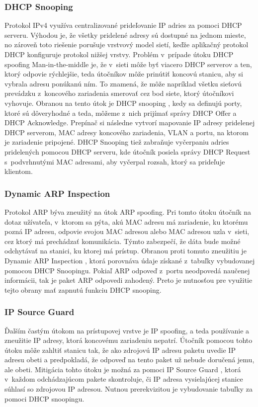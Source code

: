 \subsubsection{DHCP Snooping}
Protokol IPv4 využíva centralizované prideľovanie IP adries za pomoci DHCP serveru. Výhodou je, že všetky pridelené adresy sú dostupné na jednom mieste, no zároveň toto riešenie porušuje vrstvový model sietí, keďže aplikačný protokol DHCP konfiguruje protokol nižšej vrstvy. Problém v~prípade útoku DHCP spoofing Man-in-the-middle je, že v~sieti môže byť viacero DHCP serverov a ten, ktorý odpovie rýchlejšie, teda útočníkov môže prinútiť koncovú stanicu, aby si vybrala adresu ponúkanú ním. To znamená, že môže napríklad všetku sieťovú prevádzku z~koncového zariadenia smerovať cez bod siete, ktorý útočníkovi vyhovuje. Obranou na tento útok je DHCP snooping \cite{Vyncke2008} \cite{Singh2018}, kedy sa definujú porty, ktoré sú dôveryhodné a teda, môžeme z~nich prijímať správy DHCP Offer a DHCP Acknowledge. Prepínač si následne vytvorí mapovanie IP adresy pridelenej DHCP serverom, MAC adresy koncového zariadenia, VLAN a portu, na ktorom je zariadenie pripojené. DHCP Snooping tiež zabraňuje vyčerpaniu adries pridelených pomocou DHCP serveru, kde útočník posiela správy DHCP Request s~podvrhnutými MAC adresami, aby vyčerpal rozsah, ktorý sa prideľuje klientom.

\subsubsection{Dynamic ARP Inspection}
Protokol ARP býva zneužitý na útok ARP spoofing. Pri tomto útoku útočník na dotaz užívateľa, v~ktorom sa pýta, akú MAC adresu má zariadenie, ku ktorému pozná IP adresu, odpovie svojou MAC adresou alebo MAC adresou uzla v~sieti, cez ktorý má prechádzať komunikácia. Týmto zabezpečí, že dáta bude možné odchytávať na stanici, ku ktorej má prístup. Obranou proti tomuto zneužitiu je Dynamic ARP Inspection \cite{McMillan2018}, ktorá porovnáva údaje získané z~tabuľky vybudovanej pomocou DHCP Snoopingu. Pokiaľ ARP odpoveď z~portu neodpovedá naučenej informácii, tak je paket ARP odpovedi zahodený. Preto je nutnosťou pre využitie tejto obrany mať zapnutú funkciu DHCP snooping.

\subsubsection{IP Source Guard}
Ďalším častým útokom na prístupovej vrstve je IP spoofing, a teda používanie a zneužitie IP adresy, ktorá koncovému zariadeniu nepatrí. Útočník pomocou tohto útoku môže zahltiť stanicu tak, že ako zdrojovú IP adresu paketu uvedie IP adresu obeti a predpokladá, že odpoveď na tento paket už nebude doručená jemu, ale obeti. Mitigácia tohto útoku je možná za pomoci IP Source Guard \cite{Singh2018}, ktorá v~každom odchádzajúcom pakete skontroluje, či IP adresa vysielajúcej stanice súhlasí so zdrojovou IP adresou. Nutnou prerekvizitou je vybudovanie tabuľky za pomoci DHCP snoopingu.    

